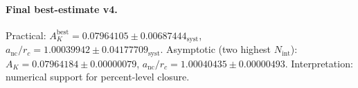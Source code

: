 \paragraph{Final best-estimate v4.}
Practical: $A_K^{\mathrm{best}} = 0.07964105 \pm 0.00687444_{\mathrm{syst}}$, $a_{\mathrm{nc}}/r_c = 1.00039942 \pm 0.04177709_{\mathrm{syst}}$.
Asymptotic (two highest $N_{\mathrm{int}}$): $A_K = 0.07964184 \pm 0.00000079$, $a_{\mathrm{nc}}/r_c = 1.00040435 \pm 0.00000493$.
Interpretation: numerical support for percent-level closure.
